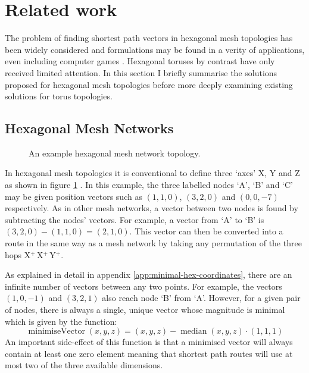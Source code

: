 	\section{Related work}
		
		The problem of finding shortest path vectors in hexagonal mesh topologies
		has been widely considered and formulations may be found in a verity of
		applications, even including computer games \cite{patel15}. Hexagonal
		toruses by contrast have only received limited attention. In this section I
		briefly summarise the solutions proposed for hexagonal mesh topologies
		before more deeply examining existing solutions for torus topologies.
		
		\subsection{Hexagonal Mesh Networks}
			
			\begin{figure}
				\center
				\caption{An example hexagonal mesh network topology.}
				\label{fig:hex-mesh-topology-coordinates}
			\end{figure}
			
			In hexagonal mesh topologies it is conventional to define three `axes' X,
			Y and Z as shown in figure \ref{fig:hex-mesh-topology-coordinates}
			\cite{patel15}. In this example, the three labelled nodes `A', `B' and
			`C' may be given position vectors such as $(1, 1, 0)$, $(3, 2, 0)$ and
			$(0, 0, -7)$ respectively. As in other mesh networks, a vector between
			two nodes is found by subtracting the nodes' vectors. For example, a
			vector from `A' to `B' is $(3, 2, 0) - (1, 1, 0) = (2, 1, 0)$. This
			vector can then be converted into a route in the same way as a mesh
			network by taking any permutation of the three hops  X$^+\,$X$^+\,$Y$^+$.
			
			As explained in detail in appendix \ref{app:minimal-hex-coordinates},
			there are an infinite number of vectors between any two points. For
			example, the vectors $(1, 0, -1)$ and $(3, 2, 1)$ also reach node `B'
			from `A'. However, for a given pair of nodes, there is always a single,
			unique vector whose magnitude is minimal which is given by the function:
			\begin{equation*}
				\operatorname{minimiseVector}(x,y,z)
					= (x,y,z) - \operatorname{median}(x,y,z) \cdot (1,1,1)
			\end{equation*}
			An important side-effect of this function is that a minimised vector will
			always contain at least one zero element meaning that shortest path
			routes will use at most two of the three available dimensions.
		
